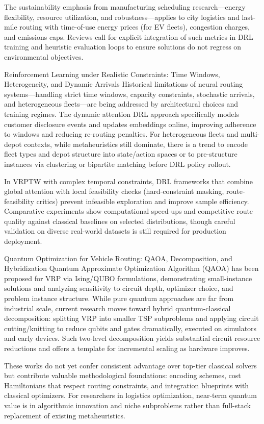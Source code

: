 The sustainability emphasis from manufacturing scheduling research—energy flexibility, resource utilization, and robustness—applies to city logistics and last-mile routing with time-of-use energy prices (for EV fleets), congestion charges, and emissions caps. Reviews call for explicit integration of such metrics in DRL training and heuristic evaluation loops to ensure solutions do not regress on environmental objectives.​

Reinforcement Learning under Realistic Constraints: Time Windows, Heterogeneity, and Dynamic Arrivals
Historical limitations of neural routing systems—handling strict time windows, capacity constraints, stochastic arrivals, and heterogeneous fleets—are being addressed by architectural choices and training regimes. The dynamic attention DRL approach specifically models customer disclosure events and updates embeddings online, improving adherence to windows and reducing re-routing penalties. For heterogeneous fleets and multi-depot contexts, while metaheuristics still dominate, there is a trend to encode fleet types and depot structure into state/action spaces or to pre-structure instances via clustering or bipartite matching before DRL policy rollout.​

In VRPTW with complex temporal constraints, DRL frameworks that combine global attention with local feasibility checks (hard-constraint masking, route-feasibility critics) prevent infeasible exploration and improve sample efficiency. Comparative experiments show computational speed-ups and competitive route quality against classical baselines on selected distributions, though careful validation on diverse real-world datasets is still required for production deployment.​

Quantum Optimization for Vehicle Routing: QAOA, Decomposition, and Hybridization
Quantum Approximate Optimization Algorithm (QAOA) has been proposed for VRP via Ising/QUBO formulations, demonstrating small-instance solutions and analyzing sensitivity to circuit depth, optimizer choice, and problem instance structure. While pure quantum approaches are far from industrial scale, current research moves toward hybrid quantum-classical decomposition: splitting VRP into smaller TSP subproblems and applying circuit cutting/knitting to reduce qubits and gates dramatically, executed on simulators and early devices. Such two-level decomposition yields substantial circuit resource reductions and offers a template for incremental scaling as hardware improves.​

These works do not yet confer consistent advantage over top-tier classical solvers but contribute valuable methodological foundations: encoding schemes, cost Hamiltonians that respect routing constraints, and integration blueprints with classical optimizers. For researchers in logistics optimization, near-term quantum value is in algorithmic innovation and niche subproblems rather than full-stack replacement of existing metaheuristics.

